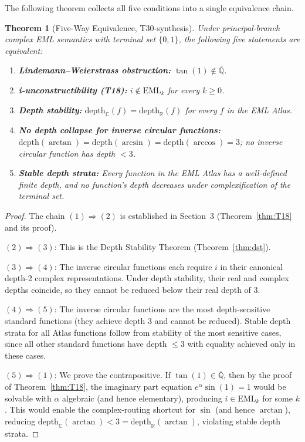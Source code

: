 \documentclass[11pt]{article}
\newtheorem{theorem}{Theorem}[section]
\begin{document}
The following theorem collects all five conditions into a single equivalence chain.

\begin{theorem}[Five-Way Equivalence, T30-synthesis]
\label{thm:fiveways}
Under principal-branch complex EML semantics with terminal set $\{0, 1\}$,
the following five statements are equivalent:
\begin{enumerate}
\item[\textbf{(1)}] \textbf{Lindemann--Weierstrass obstruction:}
      $\tan(1) \notin \overline{\mathbb{Q}}$.
\item[\textbf{(2)}] \textbf{i-unconstructibility (T18):}
      $i \notin \mathrm{EML}_k$ for every $k \geq 0$.
\item[\textbf{(3)}] \textbf{Depth stability:}
      $\mathrm{depth}_\mathbb{C}(f) = \mathrm{depth}_\mathbb{R}(f)$
      for every $f$ in the EML Atlas.
\item[\textbf{(4)}] \textbf{No depth collapse for inverse circular functions:}
      $\mathrm{depth}(\arctan) = \mathrm{depth}(\arcsin) = \mathrm{depth}(\arccos) = 3$;
      no inverse circular function has depth $< 3$.
\item[\textbf{(5)}] \textbf{Stable depth strata:}
      Every function in the EML Atlas has a well-defined finite depth, and
      no function's depth decreases under complexification of the terminal set.
\end{enumerate}
\end{theorem}

\begin{proof}
The chain $(1) \Rightarrow (2)$ is established in Section~3
(Theorem~\ref{thm:T18} and its proof).

$(2) \Rightarrow (3)$: This is the Depth Stability Theorem (Theorem~\ref{thm:dst}).

$(3) \Rightarrow (4)$: The inverse circular functions each require $i$ in their
canonical depth-2 complex representations.  Under depth stability,
their real and complex depths coincide, so they cannot be reduced below their
real depth of 3.

$(4) \Rightarrow (5)$: The inverse circular functions are the most depth-sensitive
standard functions (they achieve depth 3 and cannot be reduced).  Stable depth strata
for all Atlas functions follow from stability of the most sensitive cases, since all
other standard functions have depth $\leq 3$ with equality achieved only in these cases.

$(5) \Rightarrow (1)$: We prove the contrapositive.  If $\tan(1) \in \overline{\mathbb{Q}}$,
then by the proof of Theorem~\ref{thm:T18}, the imaginary part equation
$e^\alpha \sin(1) = 1$ would be solvable with $\alpha$ algebraic (and hence elementary),
producing $i \in \mathrm{EML}_k$ for some $k$.
This would enable the complex-routing shortcut for $\sin$ (and hence $\arctan$),
reducing $\mathrm{depth}_\mathbb{C}(\arctan) < 3 = \mathrm{depth}_\mathbb{R}(\arctan)$,
violating stable depth strata.
\end{proof}
\end{document}
